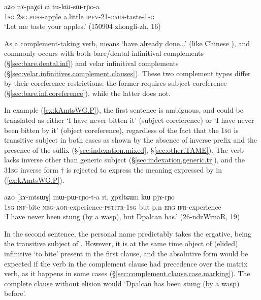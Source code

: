 \begin{exe}
\ex \label{ex:tukWsWrYoa}
 \gll aʑo nɤ-paχɕi ci tu-kɯ-sɯ-rɲo-a \\
 \textsc{1sg} \textsc{2sg}.\textsc{poss}-apple a.little \textsc{ipfv}-2\fl{}1-\textsc{caus}-taste-\textsc{1sg} \\
 \glt `Let me taste your apples.' (150904 zhongli-zh, 16)
\end{exe}    
    
As a complement-taking verb,  means `have already done...' (like Chinese  ), and commonly occurs with both bare/dental infinitival complements (§\ref{sec:bare.dental.inf}) and velar infinitival complements (§\ref{sec:velar.infinitives.complement.clauses}). These two complement types differ by their coreference restrictions: the former requires subject coreference (§\ref{sec:bare.inf.coreference}), while the latter does not.


In example (\ref{ex:kAmtsWG.P}), the first sentence  is ambiguous, and could be translated as either `I have never bitten it' (subject coreference) or `I have never been bitten by it' (object coreference), regardless of the fact that the \textsc{1sg} is transitive subject in both cases as shown by the absence of inverse prefix and the presence of the  suffix (§\ref{sec:indexation.mixed}, §\ref{sec:other.TAME}). The verb  lacks inverse other than generic subject (§\ref{sec:indexation.generic.tr}), and the 3\fl{}\textsc{1sg} inverse form $\dagger$ is rejected to express the meaning expressed by  in (\ref{ex:kAmtsWG.P}).

\begin{exe}
\ex   \label{ex:kAmtsWG.P} 
\gll aʑo [kɤ-mtsɯɣ] mɯ-pɯ-rɲo-t-a ri, χpɤltɕɯn kɯ pjɤ-rɲo  \\
\textsc{1sg} \textsc{inf}-bite \textsc{neg}-\textsc{aor}-experience-\textsc{pst}:\textsc{tr}-\textsc{1sg} but p.n \textsc{erg}  \textsc{ifr}-experience \\
\glt `I have never been stung (by a wasp), but Dpalcan has.' (26-ndzWrnaR, 19) 
\end{exe}  
 
In the second sentence, the personal name  predictably takes the ergative, being the transitive subject of . However, it is at the same time object of (elided) infinitive  `to bite' present in the first clause, and the absolutive form would be expected if the verb in the complement clause had precedence over the matrix verb, as it happens in some cases (§\ref{sec:complement.clause.case.marking}). The complete clause without elision would  `Dpalcan has been stung (by a wasp) before'.


